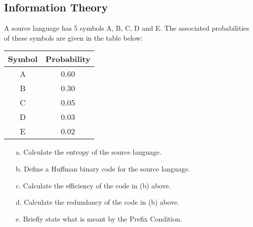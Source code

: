 
\subsection*{Information Theory }
A source language has 5 symbols A, B, C, D and E. The associated
probabilities of these symbols are given in the table below:
\begin{center}
\begin{tabular}{|c|c|}
\hline
Symbol & Probability \\ \hline
A & 0.60 \\
B & 0.30 \\
C & 0.05 \\
D & 0.03 \\
E & 0.02 \\
\hline
\end{tabular}
\end{center}

\begin{itemize}
\item[a.] Calculate the entropy of the source language.
\item[b.] Define a Huffman binary code for the source language.
\item[c.] Calculate the efficiency of the code in (b) above.
\item[d.] Calculate the redundancy of the code in (b) above.
\item[e.] Briefly state what is meant by the Prefix Condition.
\end{itemize}

